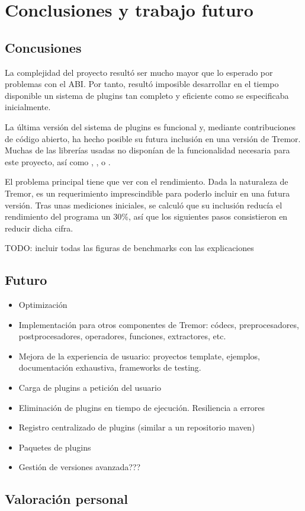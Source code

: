 
\chapter{Conclusiones y trabajo futuro}

\section{Concusiones}

La complejidad del proyecto resultó ser mucho mayor que lo esperado por
problemas con el ABI. Por tanto, resultó imposible desarrollar en el tiempo
disponible un sistema de plugins tan completo y eficiente como se especificaba
inicialmente.

La última versión del sistema de plugins es funcional y, mediante contribuciones
de código abierto, ha hecho posible su futura inclusión en una versión de
Tremor. Muchas de las librerías usadas no disponían de la funcionalidad
necesaria para este proyecto, así como , ,
 o .

El problema principal tiene que ver con el rendimiento. Dada la naturaleza de
Tremor, es un requerimiento imprescindible para poderlo incluir en una futura
versión. Tras unas mediciones iniciales, se calculó que su inclusión reducía el
rendimiento del programa un 30\%, así que los siguientes pasos consistieron en
reducir dicha cifra.

TODO: incluir todas las figuras de benchmarks con las explicaciones

\section{Futuro}

\begin{itemize}
    \item Optimización

    \item Implementación para otros componentes de Tremor: códecs,
        preprocesadores, postprocesadores, operadores, funciones, extractores,
        etc.

    \item Mejora de la experiencia de usuario: proyectos template, ejemplos,
        documentación exhaustiva, frameworks de testing.

    \item Carga de plugins a petición del usuario

    \item Eliminación de plugins en tiempo de ejecución. Resiliencia a errores

    \item Registro centralizado de plugins (similar a un repositorio maven)

    \item Paquetes de plugins

    \item Gestión de versiones avanzada???

\end{itemize}

\section{Valoración personal}
